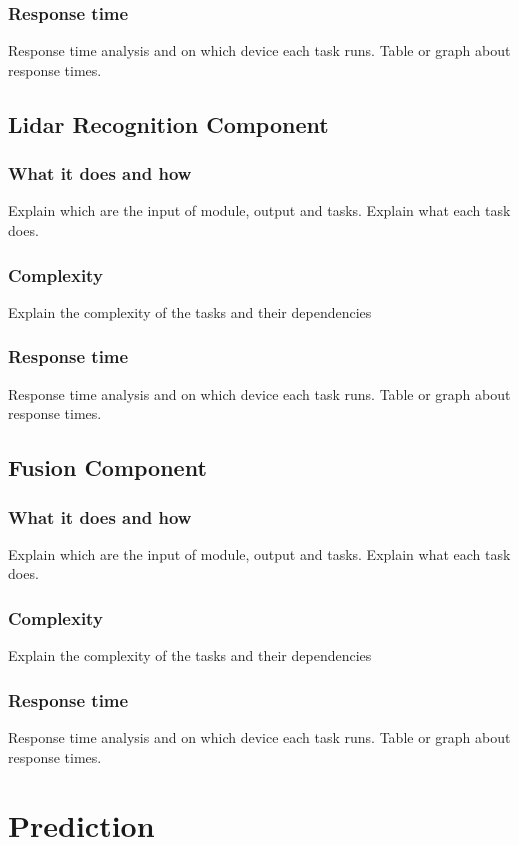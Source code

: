 \documentclass[conference]{IEEEtran}
\begin{document}
\subsubsection{Response time}
Response time analysis and on which device each task runs.
Table or graph about response times.

\subsection{Lidar Recognition Component}

\subsubsection{What it does and how}
Explain which are the input of module, output and tasks.
Explain what each task does.
\subsubsection{Complexity}
Explain the complexity of the tasks and their dependencies
\subsubsection{Response time}
Response time analysis and on which device each task runs.
Table or graph about response times.

\subsection{Fusion Component}

\subsubsection{What it does and how}
Explain which are the input of module, output and tasks.
Explain what each task does.
\subsubsection{Complexity}
Explain the complexity of the tasks and their dependencies
\subsubsection{Response time}
Response time analysis and on which device each task runs.
Table or graph about response times.

\section{Prediction}
\end{document}
